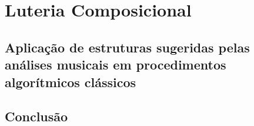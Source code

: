 \documentclass[
	12pt,				%
	openright,			%
	twoside,			%
	a4paper,			%
	english,			%
	french,				%
	spanish,			%
	brazil				%
	]{abntex2}
\begin{document}
\part{Luteria Composicional}
\label{composicional}

\chapter{Aplicação de estruturas sugeridas pelas análises musicais em procedimentos algorítmicos clássicos}





\chapter*[Conclusão]{Conclusão}

\lipsum[31-33]

\postextual

%

%
%

\end{document}

